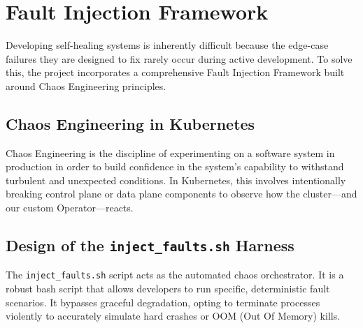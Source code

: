\documentclass[12pt,a4paper]{article}
\begin{document}
\newpage

\section{Fault Injection Framework}
\onehalfspacing
Developing self-healing systems is inherently difficult because the edge-case failures they are designed to fix rarely occur during active development. To solve this, the project incorporates a comprehensive Fault Injection Framework built around Chaos Engineering principles.

\subsection{Chaos Engineering in Kubernetes}
Chaos Engineering is the discipline of experimenting on a software system in production in order to build confidence in the system's capability to withstand turbulent and unexpected conditions. In Kubernetes, this involves intentionally breaking control plane or data plane components to observe how the cluster—and our custom Operator—reacts.

\subsection{Design of the \texttt{inject\_faults.sh} Harness}
The \texttt{inject\_faults.sh} script acts as the automated chaos orchestrator. It is a robust bash script that allows developers to run specific, deterministic fault scenarios. It bypasses graceful degradation, opting to terminate processes violently to accurately simulate hard crashes or OOM (Out Of Memory) kills.
\end{document}
